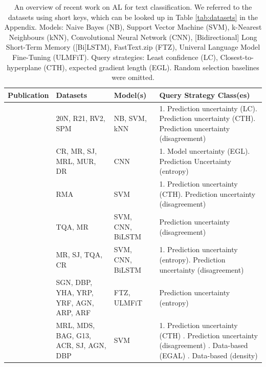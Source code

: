 \begin{table}[h!]
  \begin{center}
  \begin{tabular}{l P{3cm} P{2.5cm} P{4.5cm}}
    \hline
    \textbf{Publication} & \textbf{Datasets} & \textbf{Model(s)} & \textbf{Query Strategy Class(es)}\\
    \hline
    \mbox{} & 20N, R21, RV2, SPM & NB, SVM, kNN & 1. Prediction uncertainty (LC). Prediction uncertainty (CTH). Prediction uncertainty (disagreement) \\
    \mbox{} & CR, MR, SJ, MRL, MUR, DR & CNN & 1. Model uncertainty (EGL). Prediction Uncertainty (entropy)\\
    \mbox{} & RMA & SVM & 1. Prediction uncertainty (CTH). Prediction uncertainty (disagreement)\\
    \mbox{} & TQA, MR & SVM, CNN, BiLSTM & Prediction uncertainty (disagreement)\\
    \mbox{} & MR, SJ, TQA, CR & SVM, CNN, BiLSTM & 1. Prediction uncertainty (entropy). Prediction uncertainty (disagreement)\\
    \mbox{} & SGN, DBP, YHA, YRP, YRF, AGN, ARP, ARF & FTZ, ULMFiT & Prediction uncertainty (entropy)\\
    \mbox{} & MRL, MDS, BAG, G13, ACR, SJ, AGN, DBP &  SVM & 1. Prediction uncertainty (CTH) . Prediction uncertainty (disagreement) . Data-based (EGAL) . Data-based (density)\\
    \hline 
  \end{tabular}
  \captionsetup{aboveskip=10pt}
  \caption{An overview of recent work on AL for text classification.
    We referred to the datasets using short keys, which can be looked up in Table \ref{tab:datasets} in the Appendix. Models: Naive Bayes (NB), Support Vector Machine (SVM), k-Nearest Neighbours (kNN), Convolutional Neural Network (CNN), [Bidirectional] Long Short-Term Memory ([Bi]LSTM), FastText.zip (FTZ), Univeral Language Model Fine-Tuning (ULMFiT). Query strategies: Least confidence (LC), Closest-to-hyperplane (CTH), expected gradient length (EGL).
    Random selection baselines were omitted.}
  \label{table:recent_work}
\end{center}
\end{table}

